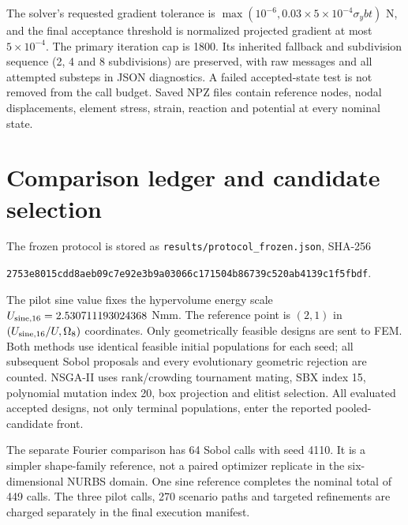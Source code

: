 \documentclass[11pt]{article}
\begin{document}
The solver's requested gradient tolerance is $\max(10^{-6},0.03\times5\times10^{-4}\sigma_ybt)$ N, and the final acceptance threshold is normalized projected gradient at most $5\times10^{-4}$. The primary iteration cap is 1800. Its inherited fallback and subdivision sequence (2, 4 and 8 subdivisions) are preserved, with raw messages and all attempted substeps in JSON diagnostics. A failed accepted-state test is not removed from the call budget. Saved NPZ files contain reference nodes, nodal displacements, element stress, strain, reaction and potential at every nominal state.

\section{Comparison ledger and candidate selection}
The frozen protocol is stored as \texttt{results/protocol\_frozen.json}, SHA-256
\begin{center}\small\texttt{2753e8015cdd8aeb09c7e92e3b9a03066c171504b86739c520ab4139c1f5fbdf}.\end{center}
The pilot sine value fixes the hypervolume energy scale $U_{\rm sine,16}=2.530711193024368$ Nmm. The reference point is $(2,1)$ in $(U_{\rm sine,16}/U,\Omega_8)$ coordinates. Only geometrically feasible designs are sent to FEM. Both methods use identical feasible initial populations for each seed; all subsequent Sobol proposals and every evolutionary geometric rejection are counted. NSGA-II uses rank/crowding tournament mating, SBX index 15, polynomial mutation index 20, box projection and elitist selection. All evaluated accepted designs, not only terminal populations, enter the reported pooled-candidate front.

\begin{table}[ht]
\centering\small
\caption{New direct-search comparison. Each row has exactly 64 expensive path calls. Times include geometric proposals and bookkeeping and were measured with two concurrent single-thread workers; they are descriptive elapsed times.}
\resizebox{\textwidth}{!}{}
\end{table}

The separate Fourier comparison has 64 Sobol calls with seed 4110. It is a simpler shape-family reference, not a paired optimizer replicate in the six-dimensional NURBS domain. One sine reference completes the nominal total of 449 calls. The three pilot calls, 270 scenario paths and targeted refinements are charged separately in the final execution manifest.
\end{document}
